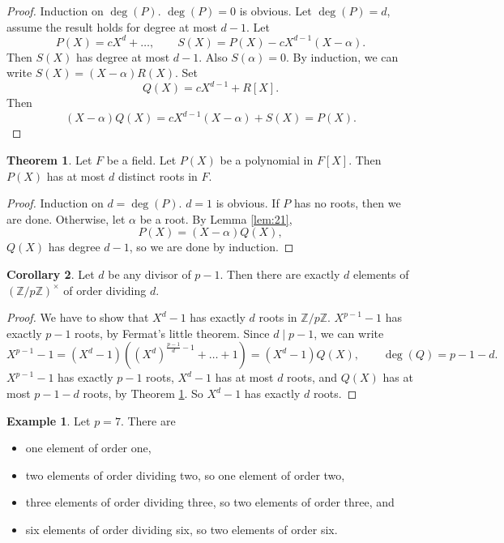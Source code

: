 \documentclass{article}
\newcommand{\Z}{\mathbb{Z}}
\newcommand{\rb}[1]{\left( #1 \right)}
\renewcommand{\sb}[1]{\left[ #1 \right]}
\newcommand{\unit}[1]{\rb{\Z / #1\Z}^\times}
\theoremstyle{definition}\newtheorem{definition}{Definition}
\theoremstyle{definition}\newtheorem{remark}[definition]{Remark}
\theoremstyle{definition}\newtheorem*{example}{Example}
\theoremstyle{definition}\newtheorem*{note}{Note}
\newtheorem{theorem}[definition]{Theorem}
\newtheorem{corollary}[definition]{Corollary}
\begin{document}
\begin{proof}
Induction on $ \deg\rb{P} $. $ \deg\rb{P} = 0 $ is obvious. Let $ \deg\rb{P} = d $, assume the result holds for degree at most $ d - 1 $. Let
$$ P\rb{X} = cX^d + \dots, \qquad S\rb{X} = P\rb{X} - cX^{d - 1}\rb{X - \alpha}. $$
Then $ S\rb{X} $ has degree at most $ d - 1 $. Also $ S\rb{\alpha} = 0 $. By induction, we can write $ S\rb{X} = \rb{X - \alpha}R\rb{X} $. Set
$$ Q\rb{X} = cX^{d - 1} + R\sb{X}. $$
Then
$$ \rb{X - \alpha}Q\rb{X} = cX^{d - 1}\rb{X - \alpha} + S\rb{X} = P\rb{X}. $$
\end{proof}

\begin{theorem}
\label{thm:22}
Let $ F $ be a field. Let $ P\rb{X} $ be a polynomial in $ F\sb{X} $. Then $ P\rb{X} $ has at most $ d $ distinct roots in $ F $.
\end{theorem}

\begin{proof}
Induction on $ d = \deg\rb{P} $. $ d = 1 $ is obvious. If $ P $ has no roots, then we are done. Otherwise, let $ \alpha $ be a root. By Lemma \ref{lem:21},
$$ P\rb{X} = \rb{X - \alpha}Q\rb{X}, $$
$ Q\rb{X} $ has degree $ d - 1 $, so we are done by induction.
\end{proof}

\begin{corollary}
\label{cor:23}
Let $ d $ be any divisor of $ p - 1 $. Then there are exactly $ d $ elements of $ \unit{p} $ of order dividing $ d $.
\end{corollary}

\begin{proof}
We have to show that $ X^d - 1 $ has exactly $ d $ roots in $ \Z / p\Z $. $ X^{p - 1} - 1 $ has exactly $ p - 1 $ roots, by Fermat's little theorem. Since $ d \mid p - 1 $, we can write
$$ X^{p - 1} - 1 = \rb{X^d - 1}\rb{\rb{X^d}^{\tfrac{p - 1}{d} - 1} + \dots + 1} = \rb{X^d - 1}Q\rb{X}, \qquad \deg\rb{Q} = p - 1 - d. $$
$ X^{p - 1} - 1 $ has exactly $ p - 1 $ roots, $ X^d - 1 $ has at most $ d $ roots, and $ Q\rb{X} $ has at most $ p - 1 - d $ roots, by Theorem \ref{thm:22}. So $ X^d - 1 $ has exactly $ d $ roots.
\end{proof}

\begin{example}
Let $ p = 7 $. There are
\begin{itemize}
\item one element of order one,
\item two elements of order dividing two, so one element of order two,
\item three elements of order dividing three, so two elements of order three, and
\item six elements of order dividing six, so two elements of order six.
\end{itemize}
\end{example}
\end{document}
